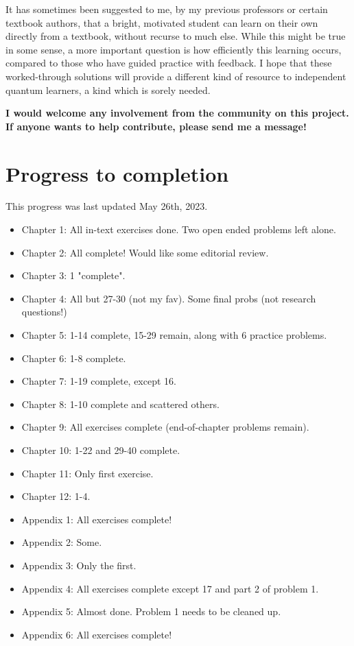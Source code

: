 \documentclass{book}
\begin{document}
It has sometimes been suggested to me, by my previous professors or certain textbook authors, that a bright, motivated student can learn on their own directly from a textbook, without recurse to much else. While this might be true in some sense, a more important question is how efficiently this learning occurs, compared to those who have guided practice with feedback. I hope that these worked-through solutions will provide a different kind of resource to independent quantum learners, a kind which is sorely needed.

\textbf{I would welcome any involvement from the community on this project. If anyone wants to help contribute, please send me a message!}

\section{Progress to completion}

This progress was last updated May 26th, 2023.

\begin{itemize}
    \item Chapter 1: All in-text exercises done. Two open ended problems left alone.
    \item Chapter 2: All complete! Would like some editorial review.
    \item Chapter 3: 1 "complete".
    \item Chapter 4: All but 27-30 (not my fav). Some final probs (not research questions!)
    \item Chapter 5: 1-14 complete, 15-29 remain, along with 6 practice problems.
    \item Chapter 6: 1-8 complete.
    \item Chapter 7: 1-19 complete, except 16.
    \item Chapter 8: 1-10 complete and scattered others.
    \item Chapter 9: All exercises complete (end-of-chapter problems remain).
    \item Chapter 10: 1-22 and 29-40 complete.
    \item Chapter 11: Only first exercise.
    \item Chapter 12: 1-4.
    \item Appendix 1: All exercises complete!
    \item Appendix 2: Some.
    \item Appendix 3: Only the first.
    \item Appendix 4: All exercises complete except 17 and part 2 of problem 1.
    \item Appendix 5: Almost done. Problem 1 needs to be cleaned up. 
    \item Appendix 6: All exercises complete!
\end{itemize}
\end{document}
